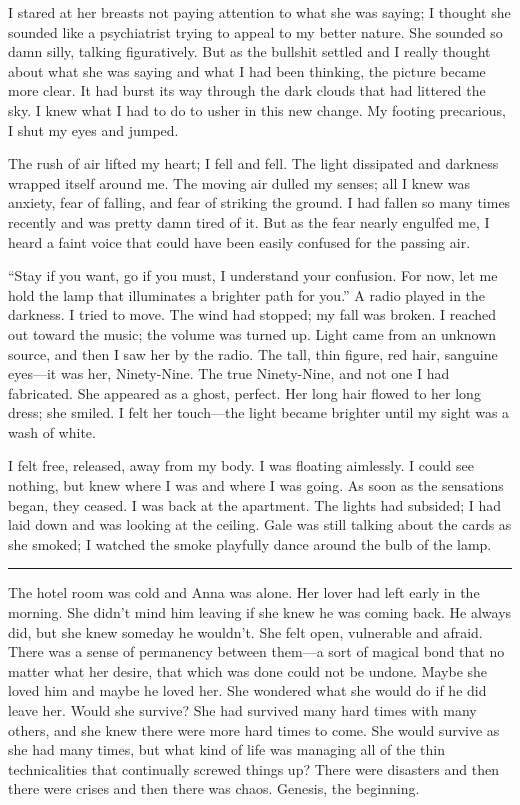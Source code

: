 I stared at her breasts not paying attention to what she was saying; I
thought she sounded like a psychiatrist trying to appeal to my better
nature. She sounded so damn silly, talking figuratively. But as the
bullshit settled and I really thought about what she was saying and what
I had been thinking, the picture became more clear. It had burst its way
through the dark clouds that had littered the sky. I knew what I had to
do to usher in this new change. My footing precarious, I shut my eyes
and jumped.

The rush of air lifted my heart; I fell and fell. The light dissipated
and darkness wrapped itself around me. The moving air dulled my senses;
all I knew was anxiety, fear of falling, and fear of striking the
ground. I had fallen so many times recently and was pretty damn tired of
it. But as the fear nearly engulfed me, I heard a faint voice that could
have been easily confused for the passing air.

``Stay if you want, go if you must, I understand your confusion. For
now, let me hold the lamp that illuminates a brighter path for you.'' A
radio played in the darkness. I tried to move. The wind had stopped; my
fall was broken. I reached out toward the music; the volume was turned
up. Light came from an unknown source, and then I saw her by the radio.
The tall, thin figure, red hair, sanguine eyes---it was her,
Ninety-Nine. The true Ninety-Nine, and not one I had fabricated. She
appeared as a ghost, perfect. Her long hair flowed to her long dress;
she smiled. I felt her touch---the light became brighter until my sight
was a wash of white.

I felt free, released, away from my body. I was floating aimlessly. I
could see nothing, but knew where I was and where I was going. As soon
as the sensations began, they ceased. I was back at the apartment. The
lights had subsided; I had laid down and was looking at the ceiling.
Gale was still talking about the cards as she smoked; I watched the
smoke playfully dance around the bulb of the lamp.

\begin{center}\rule{0.5\linewidth}{0.5pt}\end{center}

The hotel room was cold and Anna was alone. Her lover had left early in
the morning. She didn't mind him leaving if she knew he was coming back.
He always did, but she knew someday he wouldn't. She felt open,
vulnerable and afraid. There was a sense of permanency between them---a
sort of magical bond that no matter what her desire, that which was done
could not be undone. Maybe she loved him and maybe he loved her. She
wondered what she would do if he did leave her. Would she survive? She
had survived many hard times with many others, and she knew there were
more hard times to come. She would survive as she had many times, but
what kind of life was managing all of the thin technicalities that
continually screwed things up? There were disasters and then there were
crises and then there was chaos. Genesis, the beginning.


